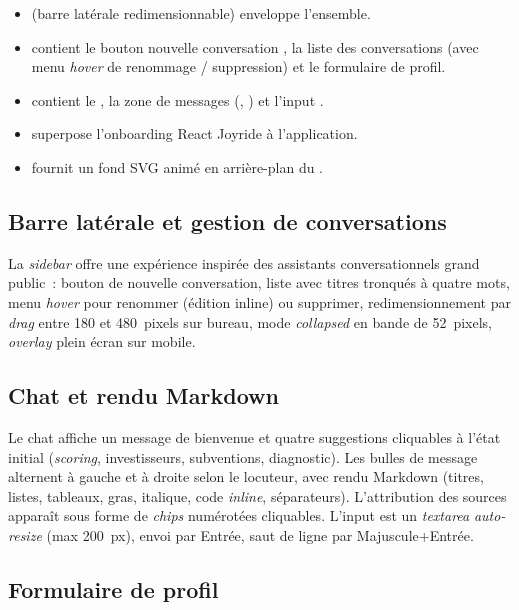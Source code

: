 \begin{itemize}
  \item {} (barre latérale redimensionnable) enveloppe l'ensemble.
  \item {} contient le bouton \og nouvelle conversation \fg, la liste des conversations (avec menu \textit{hover} de renommage / suppression) et le formulaire de profil.
  \item {} contient le , la zone de messages (, ) et l'input .
  \item {} superpose l'onboarding React Joyride à l'application.
  \item {} fournit un fond \ac{SVG} animé en arrière-plan du .
\end{itemize}

\subsection{Barre latérale et gestion de conversations}

La \textit{sidebar} offre une expérience inspirée des assistants conversationnels grand public~: bouton de nouvelle conversation, liste avec titres tronqués à quatre mots, menu \textit{hover} pour renommer (édition inline) ou supprimer, redimensionnement par \textit{drag} entre 180 et 480~pixels sur bureau, mode \textit{collapsed} en bande de 52~pixels, \textit{overlay} plein écran sur mobile.

\subsection{Chat et rendu Markdown}

Le chat affiche un message de bienvenue et quatre suggestions cliquables à l'état initial (\textit{scoring}, investisseurs, subventions, diagnostic). Les bulles de message alternent à gauche et à droite selon le locuteur, avec rendu Markdown (titres, listes, tableaux, gras, italique, code \textit{inline}, séparateurs). L'attribution des sources apparaît sous forme de \textit{chips} numérotées cliquables. L'input est un \textit{textarea} \textit{auto-resize} (max 200~px), envoi par Entrée, saut de ligne par Majuscule+Entrée.

\subsection{Formulaire de profil}

